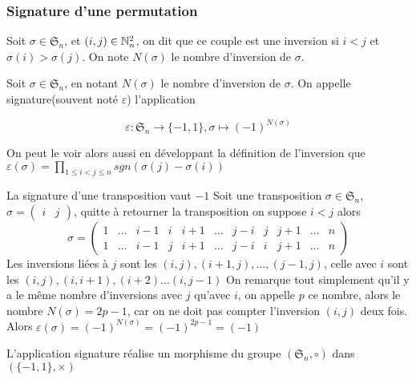 \subsubsection{Signature d'une permutation}
\begin{defini}[Inversion]
    Soit $\sigma\in\mathfrak{S}_n$, et $(i,j)\in \mathbb{N}_n^2$, on dit que ce couple est une inversion si $i<j$ et $\sigma(i)>\sigma(j)$. On note $N(\sigma)$ le nombre d'inversion de $\sigma$.
\end{defini}
\begin{defini}
    Soit $\sigma\in\mathfrak{S}_n$, en notant $N(\sigma)$ le nombre d'inversion de $\sigma$. On appelle signature(souvent noté $\varepsilon$) l'application

    $$\varepsilon : \mathfrak{S}_n\to\{-1,1\},\sigma\mapsto(-1)^{N(\sigma)}$$

    On peut le voir alors aussi en développant la définition de l'inversion que $\displaystyle\varepsilon(\sigma)=\prod_{1\leq i <j\leq n}sgn(\sigma(j)-\sigma(i))$
\end{defini}
\begin{prop}
    La signature d'une transposition vaut $-1$
    \tcblower
    Soit une transposition $\sigma\in\mathfrak{S}_n$, $\sigma=\begin{pmatrix}
    i & j
    \end{pmatrix}$, quitte à retourner la transposition on suppose $i<j$ alors $$\sigma =
        \begin{pmatrix}
        1 & \dots & i-1 & i & i+1 & \dots & j-i & j & j+1 & \dots & n \\
        1 & \dots & i-1 & j & i+1 & \dots & j-i & i & j+1 & \dots & n
        \end{pmatrix}$$
        Les inversions liées à $j$ sont les $(i,j),(i+1,j),\dots,(j-1,j)$, celle avec $i$ sont les $(i,j),(i,i+1),(i+2)\dots(i,j-1)$
        On remarque tout simplement qu'il y a le même nombre d'inversions avec $j$ qu'avec $i$, on appelle $p$ ce nombre, alors le nombre $N(\sigma)=2p-1$, car on ne doit pas compter l'inversion $(i,j)$ deux fois.
        Alors $\varepsilon(\sigma)=(-1)^{N(\sigma)}=(-1)^{2p-1}=(-1)$
\end{prop}
\begin{theoreme}
    L'application signature réalise un morphisme du groupe $(\mathfrak{S}_n,\circ)$ dans $(\{-1,1\},\times)$
    \tcblower
    
    
\end{theoreme}

